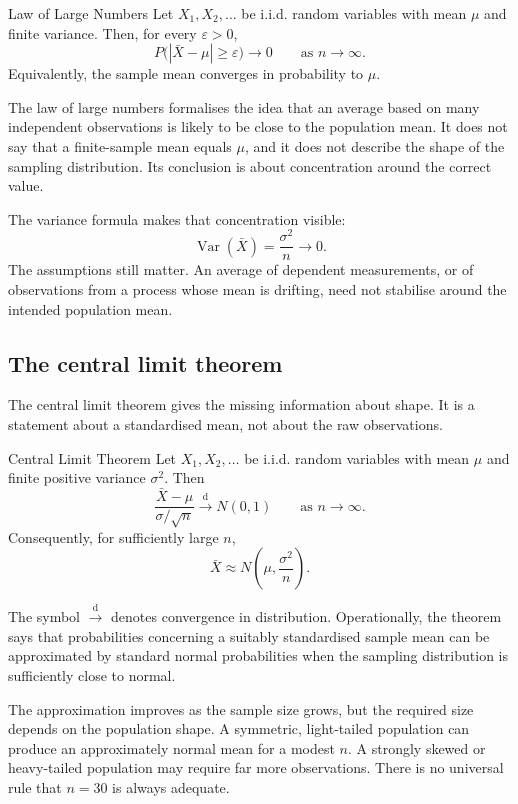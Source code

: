 \begin{theorem}{Law of Large Numbers}
Let $X_1,X_2,\ldots$ be i.i.d. random variables with mean $\mu$ and finite variance. Then, for every $\varepsilon>0$,
\[
    P\bigl(|\bar X-\mu|\geq\varepsilon\bigr)\longrightarrow0
    \qquad\text{as }n\longrightarrow\infty.
\]
Equivalently, the sample mean converges in probability to $\mu$.
\end{theorem}

The law of large numbers formalises the idea that an average based on many independent observations is likely to be close to the population mean. It does not say that a finite-sample mean equals $\mu$, and it does not describe the shape of the sampling distribution. Its conclusion is about concentration around the correct value.

The variance formula makes that concentration visible:
\[
    \operatorname{Var}(\bar X)=\frac{\sigma^2}{n}\longrightarrow0.
\]
The assumptions still matter. An average of dependent measurements, or of observations from a process whose mean is drifting, need not stabilise around the intended population mean.

\subsection{The central limit theorem}

The central limit theorem gives the missing information about shape. It is a statement about a standardised mean, not about the raw observations.

\begin{theorem}{Central Limit Theorem}
Let $X_1,X_2,\ldots$ be i.i.d. random variables with mean $\mu$ and finite positive variance $\sigma^2$. Then
\[
    \frac{\bar X-\mu}{\sigma/\sqrt n}
      \xrightarrow{\mathrm{d}} N(0,1)
    \qquad\text{as }n\longrightarrow\infty.
\]
Consequently, for sufficiently large $n$,
\[
    \bar X\approx N\!\left(\mu,\frac{\sigma^2}{n}\right).
\]
\end{theorem}

The symbol $\xrightarrow{\mathrm d}$ denotes convergence in distribution. Operationally, the theorem says that probabilities concerning a suitably standardised sample mean can be approximated by standard normal probabilities when the sampling distribution is sufficiently close to normal.

The approximation improves as the sample size grows, but the required size depends on the population shape. A symmetric, light-tailed population can produce an approximately normal mean for a modest $n$. A strongly skewed or heavy-tailed population may require far more observations. There is no universal rule that $n=30$ is always adequate.


